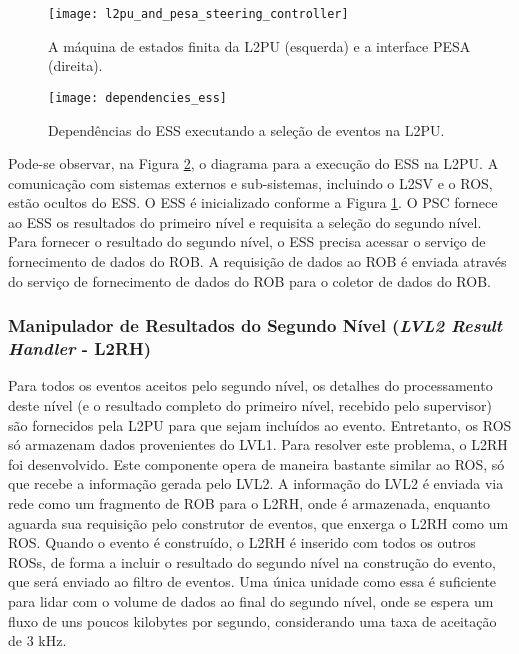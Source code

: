 \begin{figure}
\begin{center}
\texttt{[image: l2pu\_and\_pesa\_steering\_controller]}
\caption{A máquina de estados finita da L2PU (esquerda) e a interface PESA (direita).}
\label{fig:l2pu_pesa}
\end{center}
\end{figure}

\begin{figure}
\begin{center}
\texttt{[image: dependencies\_ess]}
\caption{Dependências do ESS executando a seleção de eventos na L2PU.}
\label{fig:dependencies_ess}
\end{center}
\end{figure}

Pode-se observar, na Figura \ref{fig:dependencies_ess}, o diagrama para a execução do ESS na L2PU. A comunicação com sistemas externos e sub-sistemas, incluindo o L2SV e o ROS, estão ocultos do ESS. O ESS é inicializado conforme a Figura \ref{fig:l2pu_pesa}. O PSC fornece ao ESS os resultados do primeiro nível e requisita a seleção do segundo nível. Para fornecer o resultado do segundo nível, o ESS precisa acessar o serviço de fornecimento de dados do ROB. A requisição de dados ao ROB é enviada através do serviço de fornecimento de dados do ROB para o coletor de dados do ROB.


\subsubsection{Manipulador de Resultados do Segundo Nível (\emph{LVL2 Result Handler} - L2RH)}

Para todos os eventos aceitos pelo segundo nível, os detalhes do processamento deste nível (e o resultado completo do primeiro nível, recebido pelo supervisor) são fornecidos pela L2PU para que sejam incluídos ao evento. Entretanto, os ROS só armazenam dados provenientes do LVL1. Para resolver este problema, o L2RH foi desenvolvido. Este componente opera de maneira bastante similar ao ROS, só que recebe a informação gerada pelo LVL2. A informação do LVL2 é enviada via rede como um fragmento de ROB para o L2RH, onde é armazenada, enquanto aguarda sua requisição pelo construtor de eventos, que enxerga o L2RH como um ROS. Quando o evento é construído, o L2RH é inserido com todos os outros ROSs, de forma a incluir o resultado do segundo nível na construção do evento, que será enviado ao filtro de eventos. Uma única unidade como essa é suficiente para lidar com o volume de dados ao final do segundo nível, onde se espera um fluxo de uns poucos kilobytes por segundo, considerando uma taxa de aceitação de 3 kHz.


